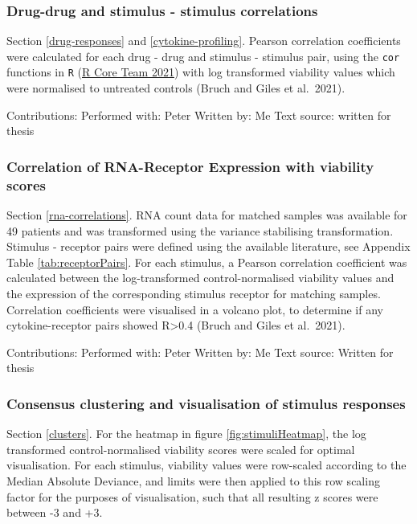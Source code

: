\documentclass[11pt, a4paper, twosided]{book}
\begin{document}
\hypertarget{correlations}{%
\subsubsection{Drug-drug and stimulus - stimulus correlations}\label{correlations}}

Section \ref{drug-responses} and \ref{cytokine-profiling}. Pearson correlation coefficients were calculated for each drug - drug and stimulus - stimulus pair, using the \texttt{cor} functions in \texttt{R} (\protect\hyperlink{ref-R-base}{R Core Team 2021}) with log transformed viability values which were normalised to untreated controls (Bruch and Giles et al.~2021).

Contributions:
Performed with: Peter
Written by: Me
Text source: written for thesis

\hypertarget{correlation-of-rna-receptor-expression-with-viability-scores}{%
\subsubsection{Correlation of RNA-Receptor Expression with viability scores}\label{correlation-of-rna-receptor-expression-with-viability-scores}}

Section \ref{rna-correlations}. RNA count data for matched samples was available for 49 patients and was transformed using the variance stabilising transformation. Stimulus - receptor pairs were defined using the available literature, see Appendix Table \ref{tab:receptorPairs}. For each stimulus, a Pearson correlation coefficient was calculated between the log-transformed control-normalised viability values and the expression of the corresponding stimulus receptor for matching samples. Correlation coefficients were visualised in a volcano plot, to determine if any cytokine-receptor pairs showed R\textgreater0.4 (Bruch and Giles et al.~2021).

Contributions:
Performed with: Peter
Written by: Me
Text source: Written for thesis

\hypertarget{stimulus-heatmap-method}{%
\subsubsection{Consensus clustering and visualisation of stimulus responses}\label{stimulus-heatmap-method}}

Section \ref{clusters}. For the heatmap in figure \ref{fig:stimuliHeatmap}, the log transformed control-normalised viability scores were scaled for optimal visualisation. For each stimulus, viability values were row-scaled according to the Median Absolute Deviance, and limits were then applied to this row scaling factor for the purposes of visualisation, such that all resulting z scores were between -3 and +3.
\end{document}
